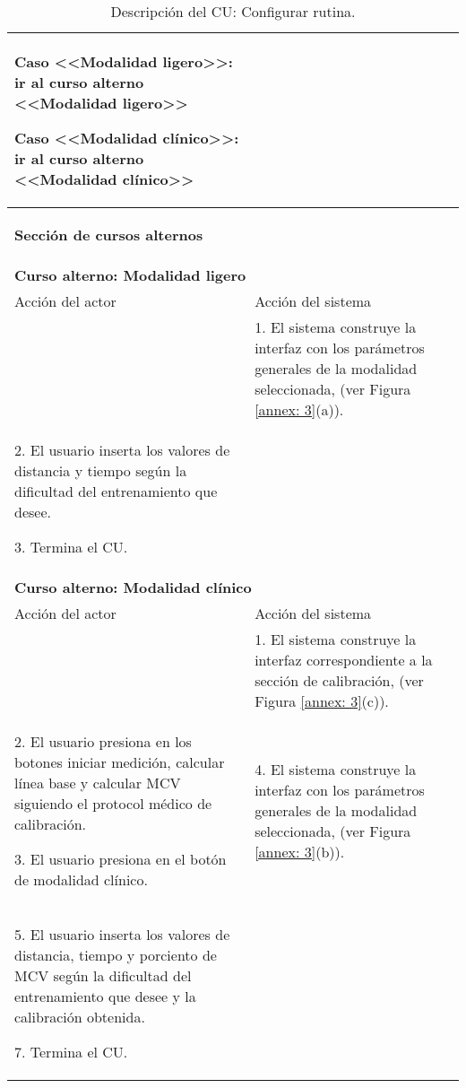 \begin{table}
\begin{tabularx}{1.2\textwidth}{|X|X|}
        Caso <<Modalidad ligero>>: ir al curso alterno <<Modalidad ligero>>
        
        Caso <<Modalidad clínico>>: ir al curso alterno <<Modalidad clínico>> & \\\hline
        
        \multicolumn{2}{|X|}{        
        \begin{minipage}[t]{0.925\columnwidth}
            \begin{center}
                \textbf{Sección de cursos alternos}
            \end{center}
        \end{minipage}} \\\hline
        \multicolumn{2}{|X|}{        
        \begin{minipage}[t]{0.925\columnwidth}
                \textbf{Curso alterno: Modalidad ligero}
        \end{minipage}} \\\hline
        
        Acción del actor & Acción del sistema \\\hline
        & 
        1. El sistema construye la interfaz con los parámetros generales de la modalidad seleccionada, (ver Figura \ref{annex: 3}(a)). \\\hline
        2. El usuario inserta los valores de distancia y tiempo según la dificultad del entrenamiento que desee. 
        
        3. Termina el CU. 
        & \\\hline
        \multicolumn{2}{|X|}{        
        \begin{minipage}[t]{0.925\columnwidth}
                \textbf{Curso alterno: Modalidad clínico}
        \end{minipage}} \\\hline
        
        Acción del actor & Acción del sistema \\\hline
        & 
        1. El sistema construye la interfaz correspondiente a la sección de calibración, (ver Figura \ref{annex: 3}(c)). \\\hline
        2. El usuario presiona en los botones iniciar medición, calcular línea base y calcular MCV siguiendo el protocol médico de calibración.
        
        3. El usuario presiona en el botón de modalidad clínico.
        &
        4. El sistema construye la interfaz con los parámetros generales de la modalidad seleccionada, (ver Figura \ref{annex: 3}(b)). \\\hline
        5. El usuario inserta los valores de distancia, tiempo y porciento de MCV según la dificultad del entrenamiento que desee y la calibración obtenida. 
        
        7. Termina el CU. 
        &\\\hline
    \end{tabularx}
    \caption{Descripción del CU: Configurar rutina.}
\end{table}
